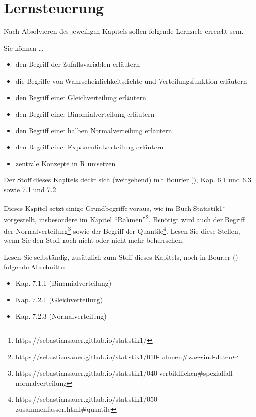 \documentclass[
  ngerman,
  letterpaper,
  twoside,
  open=any]{scrbook}
\providecommand{\tightlist}{%
  \setlength{\itemsep}{0pt}\setlength{\parskip}{0pt}}\usepackage{longtable,booktabs,array}
\theoremstyle{definition}
\theoremstyle{plain}
\theoremstyle{definition}
\theoremstyle{definition}
\theoremstyle{definition}
\theoremstyle{definition}
\theoremstyle{remark}
\begin{document}
\section{Lernsteuerung}\label{lernsteuerung-4}

Nach Absolvieren des jeweiligen Kapitels sollen folgende Lernziele
erreicht sein.

Sie können \ldots{}

\begin{itemize}
\tightlist
\item
  den Begriff der Zufallsvariablen erläutern
\item
  die Begriffe von Wahrscheinlichkeitsdichte und Verteilungsfunktion
  erläutern
\item
  den Begriff einer Gleichverteilung erläutern
\item
  den Begriff einer Binomialverteilung erläutern
\item
  den Begriff einer halben Normalverteilung erläutern
\item
  den Begriff einer Exponentialverteilung erläutern
\item
  zentrale Konzepte in R umsetzen
\end{itemize}

Der Stoff dieses Kapitels deckt sich (weitgehend) mit Bourier
(), Kap. 6.1 und 6.3 sowie 7.1 und 7.2.

Dieses Kapitel setzt einige Grundbegriffe voraus, wie im Buch
Statistik1\footnote{https://sebastiansauer.github.io/statistik1/}
vorgestellt, insbesondere im Kapitel \enquote{Rahmen}\footnote{https://sebastiansauer.github.io/statistik1/010-rahmen\#was-sind-daten}.
Benötigt wird auch der Begriff der Normalverteilung\footnote{https://sebastiansauer.github.io/statistik1/040-verbildlichen\#spezialfall-normalverteilung}
sowie der Begriff der Quantile\footnote{https://sebastiansauer.github.io/statistik1/050-zusammenfassen.html\#quantile}.
Lesen Sie diese Stellen, wenn Sie den Stoff noch nicht oder nicht mehr
beherrschen.

Lesen Sie selbständig, zusätzlich zum Stoff dieses Kapitels, noch in
Bourier () folgende Abschnitte:

\begin{itemize}
\tightlist
\item
  Kap. 7.1.1 (Binomialverteilung)
\item
  Kap. 7.2.1 (Gleichverteilung)
\item
  Kap. 7.2.3 (Normalverteilung)
\end{itemize}
\end{document}
